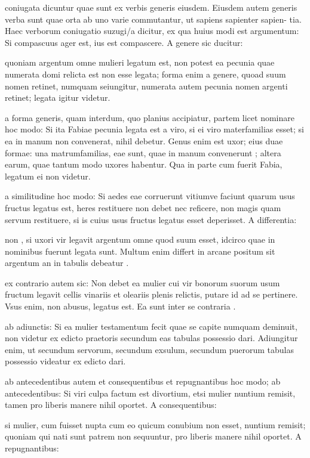  coniugata dicuntur quae sunt ex verbis generis eiusdem. Eiusdem autem generis verba sunt quae orta ab uno varie commutantur, ut sapiens sapienter sapien- tia. Haec verborum coniugatio suzugi/a dicitur, ex qua huius modi est argumentum: Si compascuus ager est, ius est compascere. A genere sic ducitur:

 quoniam argentum omne mulieri legatum est, non potest ea pecunia quae numerata domi relicta est non esse legata; forma enim a genere, quoad suum nomen retinet, numquam seiungitur, numerata autem pecunia nomen argenti retinet; legata igitur videtur.

 a forma generis, quam interdum, quo planius accipiatur, partem licet nominare hoc modo: Si ita Fabiae pecunia legata est a viro, si ei viro materfamilias esset; si ea in manum non convenerat, nihil debetur. Genus enim est uxor; eius duae formae: una matrumfamilias, eae sunt, quae in manum convenerunt ; altera earum, quae tantum modo uxores habentur. Qua in parte cum fuerit Fabia, legatum ei non videtur.

 a similitudine hoc modo: Si aedes eae corruerunt vitiumve faciunt quarum usus fructus legatus est, heres restituere non debet nec reficere, non magis quam servum restituere, si is cuius usus fructus legatus esset deperisset. A differentia:

 non , si uxori vir legavit argentum omne quod suum esset, idcirco quae in nominibus fuerunt legata sunt. Multum enim differt in arcane positum sit argentum an in tabulis debeatur .

 ex contrario autem sic: Non debet ea mulier cui vir bonorum suorum usum fructum legavit cellis vinariis et oleariis plenis relictis, putare id ad se pertinere. Vsus enim, non abusus, legatus est. Ea sunt inter se contraria .

 ab adiunctis: Si ea mulier testamentum fecit quae se capite numquam deminuit, non videtur ex edicto praetoris secundum eas tabulas possessio dari. Adiungitur enim, ut secundum servorum, secundum exsulum, secundum puerorum tabulas possessio videatur ex edicto dari.

 ab antecedentibus autem et consequentibus et repugnantibus hoc modo; ab antecedentibus: Si viri culpa factum est divortium, etsi mulier nuntium remisit, tamen pro liberis manere nihil oportet. A consequentibus:

 si mulier, cum fuisset nupta cum eo quicum conubium non esset, nuntium remisit; quoniam qui nati sunt patrem non sequuntur, pro liberis manere nihil oportet. A repugnantibus:

